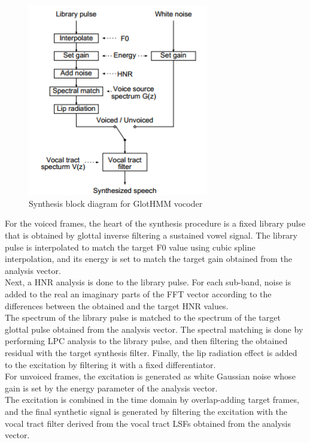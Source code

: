 \begin{figure}[htb]
	\begin{center}
	\includegraphics[width=0.7\textwidth]{img/gsynb.png}
	\end{center}
	\caption{\label{gsynb}Synthesis block diagram for GlotHMM vocoder \cite{tuomo}}
\end{figure}
For the voiced frames, the heart of the synthesis procedure is a fixed library pulse that is obtained by glottal inverse filtering a sustained vowel signal. The library pulse is interpolated to match the target F0 value using cubic spline interpolation, and its energy is set to match the target gain obtained from the analysis vector.\\
Next, a HNR analysis is done to the library pulse. For each sub-band, noise is added to the real an imaginary parts of the FFT vector according to the differences between the obtained and the target HNR values.\\
The spectrum of the library pulse is matched to the spectrum of the target glottal pulse obtained from the analysis vector. The spectral matching is done by performing LPC analysis to the library pulse, and then filtering the obtained residual with the target synthesis filter. Finally, the lip radiation effect is added to the excitation by filtering it with a fixed differentiator.\\
For unvoiced frames, the excitation is generated as white Gaussian noise whose gain is set by the energy parameter of the analysis vector.\\
The excitation is combined in the time domain by overlap-adding target frames, and the final synthetic signal is generated by filtering the excitation with the vocal tract filter derived from the vocal tract LSFs obtained from the analysis vector.\\
